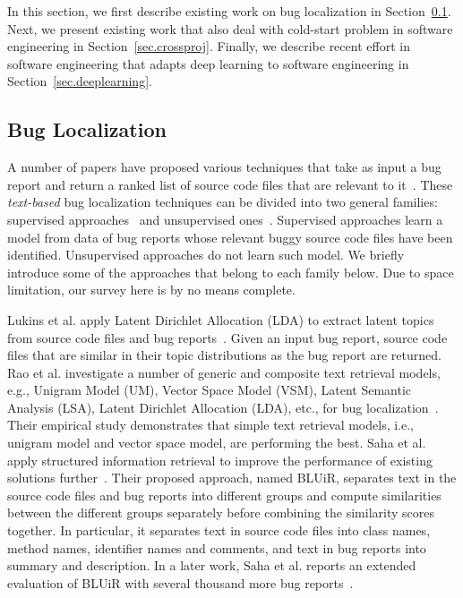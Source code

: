 In this section, we first describe existing work on bug localization in Section~\ref{sec.bugloc}. Next, we present existing work that also deal with cold-start problem in software engineering in Section~\ref{sec.crossproj}. Finally, we describe recent effort in software engineering that adapts deep learning to software engineering in Section~\ref{sec.deeplearning}.

\subsection{Bug Localization}\label{sec.bugloc}


A number of papers have proposed various techniques that take as input a bug report and return a ranked list of source code files that are relevant to it~\cite{lukins2008source,rao2011retrieval,SahaLKP13,SahaLKP14,zhou2012should,huo2016learning}. These {\em text-based} bug localization techniques can be divided into two general families: supervised approaches~\cite{zhou2012should,huo2016learning} and unsupervised ones~\cite{lukins2008source,rao2011retrieval,SahaLKP13,SahaLKP14}. Supervised approaches learn a model from data of bug reports whose relevant buggy source code files have been identified. Unsupervised approaches do not learn such model. We briefly introduce some of the approaches that belong to each family below. Due to space limitation, our survey here is by no means complete.

\vspace{0.2cm} Lukins et al. apply Latent Dirichlet Allocation (LDA) to extract latent topics from source code files and bug reports~\cite{lukins2008source}. Given an input bug report, source code files that are similar in their topic distributions as the bug report are returned. Rao et al. investigate a number of generic and composite text retrieval models, e.g., Unigram Model (UM), Vector Space Model (VSM), Latent Semantic Analysis (LSA), Latent Dirichlet Allocation (LDA), etc., for bug localization~\cite{rao2011retrieval}. Their empirical study demonstrates that simple text retrieval models, i.e., unigram model and vector space model, are performing the best. Saha et al. apply structured information retrieval to improve the performance of existing solutions further~\cite{SahaLKP13}. Their proposed approach, named BLUiR, separates text in the source code files and bug reports into different groups and compute similarities between the different groups separately before combining the similarity scores together. In particular, it separates text in source code files into class names, method names, identifier names and comments, and text in bug reports into summary and description. In a later work, Saha et al.  reports an extended evaluation of BLUiR with several thousand more bug reports~\cite{SahaLKP14}.

